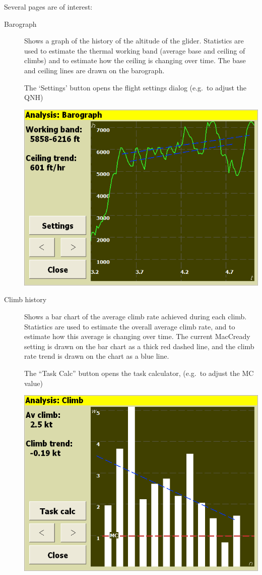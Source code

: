 Several pages are of interest:
\begin{description}
\item[Barograph]  Shows a graph of the history of the altitude of the glider.
  Statistics are used to estimate the thermal working band (average
  base and ceiling of climbs) and to estimate how the ceiling is
  changing over time.  The base and ceiling lines are drawn on the
  barograph.

  The `Settings' button opens the flight settings dialog
  (e.g.\ to adjust the QNH)

\begin{center}
\includegraphics[angle=0,width=0.8\linewidth,keepaspectratio='true']{figures/analysis-barograph.png}
\end{center}

\item[Climb history]
  Shows a bar chart of the average climb rate achieved during each
  climb.  Statistics are used to estimate the overall average climb
  rate, and to estimate how this average is changing over time.  The
  current MacCready setting is drawn on the bar chart as a thick red
  dashed line, and the climb rate trend is drawn on the chart as a
  blue line.

  The ``Task Calc'' button opens the task calculator,
  (e.g.\ to adjust the MC value)

\begin{center}
\includegraphics[angle=0,width=0.8\linewidth,keepaspectratio='true']{figures/analysis-climb.png}
\end{center}


\end{description}
